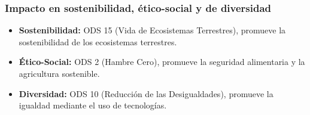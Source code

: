 \begin{frame}
    \frametitle{Impacto en sostenibilidad, ético-social y de diversidad}
    \vspace*{-1cm}
    \begin{itemize}
        \item \textbf{Sostenibilidad:} ODS 15 (Vida de Ecosistemas Terrestres), promueve la sostenibilidad de los ecosistemas terrestres.
        \item \textbf{Ético-Social:} ODS 2 (Hambre Cero), promueve la seguridad alimentaria y la agricultura sostenible.
        \item \textbf{Diversidad:} ODS 10 (Reducción de las Desigualdades), promueve la igualdad mediante el uso de tecnologías.
    \end{itemize}
\end{frame}
    